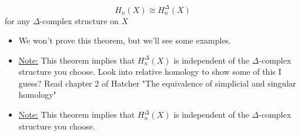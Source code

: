 \documentclass[../notes.tex]{subfiles}
\begin{document}
\begin{theorem}
    \[
        H_n(X)\cong H_n^{\Delta}(X)
    \]
    for any $\Delta$-complex structure on $X$
\end{theorem}
\begin{itemize}
    \item We won't prove this theorem, but we'll see some examples.
    \item \underline{Note:} This theorem implies that $H_n^{\Delta}(X)$
        is independent of the $\Delta$-complex structure you choose. Look
        into relative homology to show some of this I guess? Read chapter 2 of Hatcher
        "The equivalence of simplicial and singular homology"
    \item \underline{Note:} This theorem implies that $H_n^{\Delta} (X)$ is
        independent of the $\Delta$-complex structure you choose.
\end{itemize}
\end{document}
